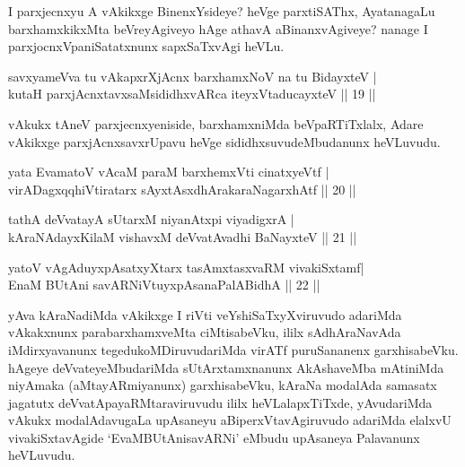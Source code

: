 \begin{artha}
I parxjecnxyu A vAkikxge BinenxYsideye? heVge parxtiSAThx, AyatanagaLu barxhamxkikxMta beVreyAgiveyo hAge athavA aBinanxvAgiveye? nanage I parxjocnxVpaniSatatxnunx sapxSaTxvAgi heVLu.
\end{artha}


\begin{shl}
savxyameVva tu vAkapxrXjAcnx barxhamxNoV na tu BidayxteV |\\
kutaH parxjAcnxtavxsaMsididhxvARca iteyxVtaducayxteV \hfill || 19 || 
\end{shl}

\begin{artha}
vAkukx tAneV parxjecnxyeniside, barxhamxniMda beVpaRTiTxlalx, Adare vAkikxge parxjAcnxsavxrUpavu heVge sididhxsuvudeMbudanunx heVLuvudu.
\end{artha}


\begin{shl}
yata EvamatoV vAcaM paraM barxhemxVti cinatxyeVtf |\\
virADagxqqhiVtiratarx sAyxtAsxdhArakaraNagarxhAtf \hfill || 20 || 
\end{shl}

\begin{shl}
tathA deVvatayA sUtarxM niyanAtx\s pi viyadigxrA |\\
kAraNAdayxKilaM vishavxM deVvatAvadhi BaNayxteV \hfill || 21 || 
\end{shl}

\begin{shl}
yatoV vAgAduyxpAsatxyXtarx tasAmxtasxvaRM vivakiSxtamf|\\
EnaM BUtAni savARNiVtuyxpAsanaPalABidhA \hfill || 22 || 
\end{shl}

\begin{artha}
yAva kAraNadiMda vAkikxge I riVti veYshiSaTxyXviruvudo adariMda vAkakxnunx parabarxhamxveMta ciMtisabeVku, ililx sAdhAraNavAda iMdirxyavanunx tegedukoMDiruvudariMda virATf puruSananenx garxhisabeVku. hAgeye deVvateyeMbudariMda sUtArxtamxnanunx AkAshaveMba mAtiniMda niyAmaka (aMtayARmiyanunx) garxhisabeVku, kAraNa modalAda samasatx jagatutx deVvatApayaRMtaraviruvudu ililx heVLalapxTiTxde, yAvudariMda vAkukx modalAdavugaLa upAsaneyu aBiperxVtavAgiruvudo adariMda elalxvU vivakiSxtavAgide `EvaMBUtAnisavARNi' eMbudu upAsaneya Palavanunx heVLuvudu.
\end{artha}


